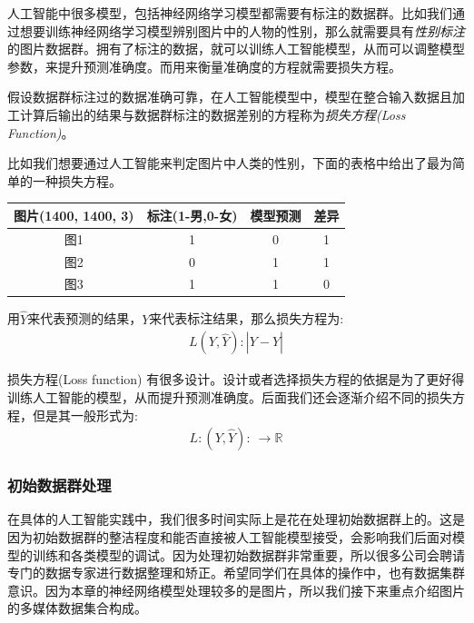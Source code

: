 \documentclass[12pt]{article}
\newcommand{\rn}{\mathbb{R}}
\numberwithin{equation}{section}
\numberwithin{figure}{section}
\begin{document}
人工智能中很多模型，包括神经网络学习模型都需要有标注的数据群。比如我们通过想要训练神经网络学习模型辨别图片中的人物的性别，那么就需要具有\textit{性别标注}的图片数据群。拥有了标注的数据，就可以训练人工智能模型，从而可以调整模型参数，来提升预测准确度。而用来衡量准确度的方程就需要损失方程。

\begin{definition}
	假设数据群标注过的数据准确可靠，在人工智能模型中，模型在整合输入数据且加工计算后输出的结果与数据群标注的数据差别的方程称为\textit{损失方程(Loss Function)}。
\end{definition}

\begin{example}
比如我们想要通过人工智能来判定图片中人类的性别，下面的表格中给出了最为简单的一种损失方程。
\begin{table}[H]
	\centering
	\renewcommand{\arraystretch}{1.5}
	\begin{tabular}{cccc}
	\hline 
		图片(1400, 1400, 3) & 标注(1-男,0-女) & 模型预测 & 差异\\
		\hline 
		图1 & 1 & 0 & 1 \\
		图2 & 0 & 1 & 1 \\
		图3 & 1 & 1 & 0 \\
		\hline 
	\end{tabular}
\end{table}
用$\hat{Y}$来代表预测的结果，$Y$来代表标注结果，那么损失方程为:
\begin{align*}
	L(Y, \hat{Y}): |Y-\hat{Y}| 
\end{align*}
\end{example}

\begin{remark}
损失方程(Loss function) 有很多设计。设计或者选择损失方程的依据是为了更好得训练人工智能的模型，从而提升预测准确度。后面我们还会逐渐介绍不同的损失方程，但是其一般形式为:
\begin{align*}
	L: (Y, \hat{Y}): \ \to \rn 
\end{align*}	
\end{remark}

\subsubsection{初始数据群处理}

在具体的人工智能实践中，我们很多时间实际上是花在处理初始数据群上的。这是因为初始数据群的整洁程度和能否直接被人工智能模型接受，会影响我们后面对模型的训练和各类模型的调试。因为处理初始数据群非常重要，所以很多公司会聘请专门的数据专家进行数据整理和矫正。希望同学们在具体的操作中，也有数据集群意识。因为本章的神经网络模型处理较多的是图片，所以我们接下来重点介绍图片的多媒体数据集合构成。
\end{document}

